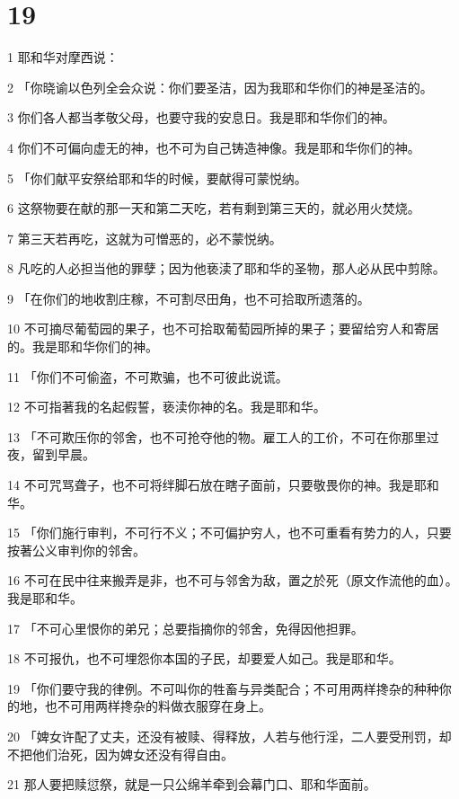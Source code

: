 \chapter{19}

\par 1 耶和华对摩西说：
\par 2 「你晓谕以色列全会众说：你们要圣洁，因为我耶和华你们的神是圣洁的。
\par 3 你们各人都当孝敬父母，也要守我的安息日。我是耶和华你们的神。
\par 4 你们不可偏向虚无的神，也不可为自己铸造神像。我是耶和华你们的神。
\par 5 「你们献平安祭给耶和华的时候，要献得可蒙悦纳。
\par 6 这祭物要在献的那一天和第二天吃，若有剩到第三天的，就必用火焚烧。
\par 7 第三天若再吃，这就为可憎恶的，必不蒙悦纳。
\par 8 凡吃的人必担当他的罪孽；因为他亵渎了耶和华的圣物，那人必从民中剪除。
\par 9 「在你们的地收割庄稼，不可割尽田角，也不可拾取所遗落的。
\par 10 不可摘尽葡萄园的果子，也不可拾取葡萄园所掉的果子；要留给穷人和寄居的。我是耶和华你们的神。
\par 11 「你们不可偷盗，不可欺骗，也不可彼此说谎。
\par 12 不可指著我的名起假誓，亵渎你神的名。我是耶和华。
\par 13 「不可欺压你的邻舍，也不可抢夺他的物。雇工人的工价，不可在你那里过夜，留到早晨。
\par 14 不可咒骂聋子，也不可将绊脚石放在瞎子面前，只要敬畏你的神。我是耶和华。
\par 15 「你们施行审判，不可行不义；不可偏护穷人，也不可重看有势力的人，只要按著公义审判你的邻舍。
\par 16 不可在民中往来搬弄是非，也不可与邻舍为敌，置之於死（原文作流他的血）。我是耶和华。
\par 17 「不可心里恨你的弟兄；总要指摘你的邻舍，免得因他担罪。
\par 18 不可报仇，也不可埋怨你本国的子民，却要爱人如己。我是耶和华。
\par 19 「你们要守我的律例。不可叫你的牲畜与异类配合；不可用两样搀杂的种种你的地，也不可用两样搀杂的料做衣服穿在身上。
\par 20 「婢女许配了丈夫，还没有被赎、得释放，人若与他行淫，二人要受刑罚，却不把他们治死，因为婢女还没有得自由。
\par 21 那人要把赎愆祭，就是一只公绵羊牵到会幕门口、耶和华面前。
